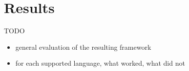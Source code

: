 \chapter{Results}
\label{chap:results}

TODO

\begin{itemize}
\item general evaluation of the resulting framework
\item for each supported language, what worked, what did not
\end{itemize}